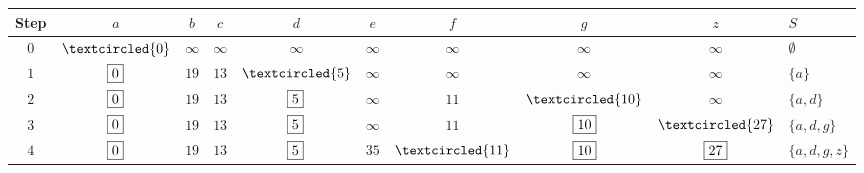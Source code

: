 \documentclass{article}
\begin{document}
            \begin{center}

            \begin{tabular}{c||c|c|c|c|c|c|c|c||l} 
            Step & $a$ & $b$ & $c$ & $d$ & $e$ & $f$ & $g$ & $z$ & $S$\\
            
            \hline
            $0$ & $\textcircled{0}$ & $\infty$ & $\infty$ & $\infty$ & $\infty$ & $\infty$ & $\infty$ & $\infty$ & $\emptyset$\\
            $1$ & $\fbox{0}$ & $19$ & $13$ & $\textcircled{5}$ & $\infty$ & $\infty$ & $\infty$ & $\infty$ & $\{a\}$\\
            $2$ & $\fbox{0}$ & $19$ & $13$ & $\fbox{5}$ & $\infty$ & $11$ & $\textcircled{10}$ & $\infty$ & $\{a,d\}$\\
            $3$ & $\fbox{0}$ & $19$ & $13$ & $\fbox{5}$ & $\infty$ & $11$ & $\fbox{10}$ & $\textcircled{27}$ & $\{a,d,g\}$\\
            $4$ & $\fbox{0}$ & $19$ & $13$ & $\fbox{5}$ & $35$ & $\textcircled{11}$ & $\fbox{10}$ & $\fbox{27}$ & $\{a,d,g,z\}$\\
            
            
            
            \end{tabular}
            
            \end{center}
\end{document}
